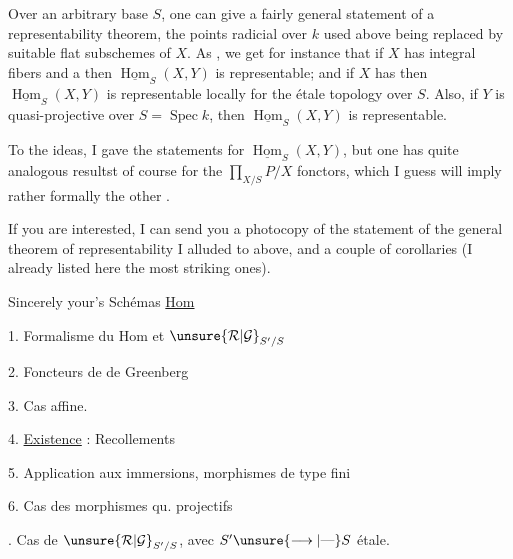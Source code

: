 Over an arbitrary base $S$, one can give a fairly general statement of a representability theorem, the points radicial over $k$ used above being replaced by suitable flat subschemes of $X$. As  , we get for instance that if $X$ has integral  fibers and a   then $\underline{\operatorname{Hom}}_S(X,Y)$ is representable; and if $X$ has  then $\underline{\operatorname{Hom}}_S(X,Y)$ is representable locally for the étale topology over $S$. Also, if $Y$ is quasi-projective over $S=\operatorname{Spec}k$, then $\underline{\operatorname{Hom}}_S(X,Y)$ is representable.

To  the ideas, I gave the statements for $\underline{\operatorname{Hom}}_S(X,Y)$, but one has quite analogous resultst of course for the $\prod_{X/S}P/X$ fonctors, which I guess will imply rather formally the other .

If you are interested, I can send you a photocopy of the statement of the general theorem of representability I alluded to\unsure{,} above, and a couple of corollaries (I already listed here the most striking ones).

Sincerely your's
Schémas \uline{Hom}  

1. Formalisme du Hom et $\unsure{\mathcal R|\mathcal G}_{S'/S}$

2.   Foncteurs de   de Greenberg

3.  Cas affine. 

4. \uline{Existence}  : Recollements 

5. Application aux immersions, morphismes de type fini 

6. Cas des morphismes qu. projectifs 

.  Cas de $\unsure{\mathcal R|\mathcal G}_{S'/S}$, avec $S'\unsure{\longrightarrow|\text{—}}S$ étale.

